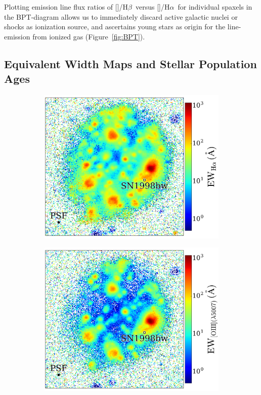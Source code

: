 \documentclass[traditabstract]{aa}
\newcommand{\hb}{H$\beta$}
\newcommand{\ha}{H$\alpha$}
\newcommand{\oiii}{[\ion{O}{iii}]}
\newcommand{\nii}{[\ion{N}{ii}]}
\begin{document}
Plotting emission line flux ratios of \oiii/\hb\, versus \nii/\ha\, for individual spaxels in the BPT-diagram \citep{1981PASP...93....5B} allows us to immediately discard active galactic nuclei or shocks as ionization source, and ascertains young stars as origin for the line-emission from ionized gas (Figure~\ref{fig:BPT}).

\subsection{Equivalent Width Maps and Stellar Population Ages}
\begin{figure}
\begin{subfigure}{.242\textwidth}
  \includegraphics[width=1.0\linewidth]{Figs/MUSE_SN1998bw_HaEW.pdf}
\end{subfigure}
\begin{subfigure}{.242\textwidth}
  \includegraphics[width=1.0\linewidth]{Figs/MUSE_SN1998bw_OIIIEW.pdf}

\end{subfigure}
\end{figure}
\end{document}

